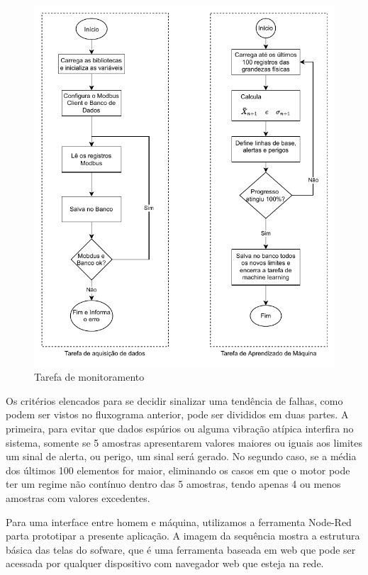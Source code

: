 \begin{figure}[H]
    \caption{Tarefa de monitoramento}
    \begin{center}
        \includegraphics[scale=1, page=2]{metodologia/img/software.pdf}
    \end{center}
    \label{fig:k-means}
\end{figure}

Os critérios elencados para se decidir sinalizar uma tendência de falhas, como podem ser vistos no fluxograma anterior, pode ser divididos
em duas partes. A primeira, para evitar que dados espúrios ou alguma vibração atípica interfira no sistema, somente se 5 amostras apresentarem 
valores maiores ou iguais aos limites um sinal de alerta, ou perigo, um sinal será gerado. No segundo caso, se a média dos últimos 100 elementos
for maior, eliminando os casos em que o motor pode ter um regime não contínuo dentro das 5 amostras, tendo apenas 4 ou menos amostras com valores
excedentes.

Para uma interface entre homem e máquina, utilizamos a ferramenta Node-Red parta prototipar a presente aplicação. A imagem da sequência mostra 
a estrutura básica das telas do sofware, que é uma ferramenta baseada em web que pode ser acessada por qualquer dispositivo com navegador web que esteja
na rede.

